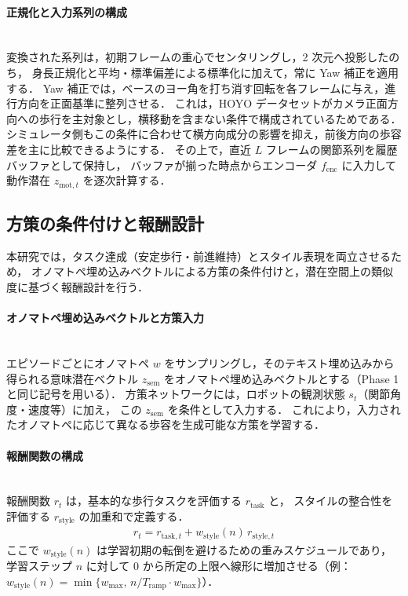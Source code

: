 \paragraph{正規化と入力系列の構成}\quad\\

変換された系列は，初期フレームの重心でセンタリングし，2 次元へ投影したのち，
身長正規化と平均・標準偏差による標準化に加えて，常に Yaw 補正を適用する．
Yaw 補正では，ベースのヨー角を打ち消す回転を各フレームに与え，進行方向を正面基準に整列させる．
これは，HOYO データセットがカメラ正面方向への歩行を主対象とし，横移動を含まない条件で構成されているためである．
シミュレータ側もこの条件に合わせて横方向成分の影響を抑え，前後方向の歩容差を主に比較できるようにする．
その上で，直近 $L$ フレームの関節系列を履歴バッファとして保持し，
バッファが揃った時点からエンコーダ $f_{\mathrm{enc}}$ に入力して
動作潜在 $z_{\mathrm{mot}, t}$ を逐次計算する．

\subsection{方策の条件付けと報酬設計}
\label{subsec:rl_reward}

本研究では，タスク達成（安定歩行・前進維持）とスタイル表現を両立させるため，
オノマトペ埋め込みベクトルによる方策の条件付けと，潜在空間上の類似度に基づく報酬設計を行う．

\paragraph{オノマトペ埋め込みベクトルと方策入力}\quad\\

エピソードごとにオノマトペ $w$ をサンプリングし，そのテキスト埋め込みから得られる意味潜在ベクトル $z_{\mathrm{sem}}$ をオノマトペ埋め込みベクトルとする（Phase 1 と同じ記号を用いる）．
方策ネットワークには，ロボットの観測状態 $s_t$（関節角度・速度等）に加え，
この $z_{\mathrm{sem}}$ を条件として入力する．
これにより，入力されたオノマトペに応じて異なる歩容を生成可能な方策を学習する．

\paragraph{報酬関数の構成}\quad\\

報酬関数 $r_t$ は，基本的な歩行タスクを評価する $r_{\mathrm{task}}$ と，
スタイルの整合性を評価する $r_{\mathrm{style}}$ の加重和で定義する．
\begin{align}
  r_t = r_{\mathrm{task}, t} + w_{\mathrm{style}}(n)\, r_{\mathrm{style}, t}
\end{align}
ここで $w_{\mathrm{style}}(n)$ は学習初期の転倒を避けるための重みスケジュールであり，
学習ステップ $n$ に対して 0 から所定の上限へ線形に増加させる（例：$w_{\mathrm{style}}(n)=\min\{w_{\max},\,n/T_{\mathrm{ramp}}\cdot w_{\max}\}$）．

